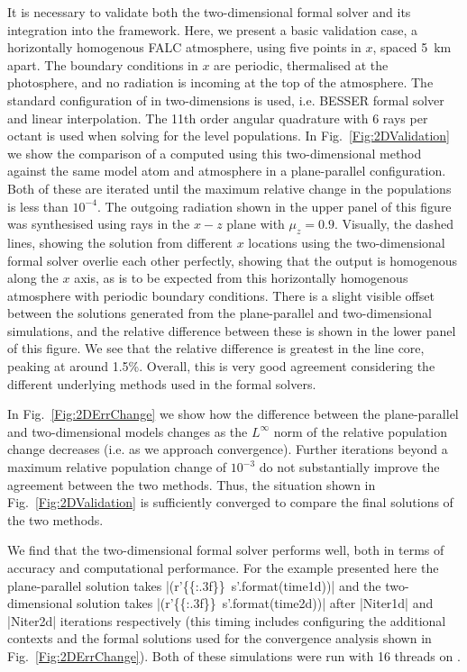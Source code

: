 It is necessary to validate both the two-dimensional formal solver and its integration into the \Lw{} framework.
Here, we present a basic validation case, a horizontally homogenous FALC atmosphere, using five points in $x$, spaced \SI{5}{\kilo\metre} apart.
The boundary conditions in $x$ are periodic, thermalised at the photosphere, and no radiation is incoming at the top of the atmosphere.
The standard configuration of \Lw{} in two-dimensions is used, i.e. BESSER formal solver and linear interpolation.
The 11th order angular quadrature with 6 rays per octant \citep{Stepan2020} is used when solving for the level populations.
In Fig.~\ref{Fig:2DValidation} we show the comparison of a \CaLine{} computed using this two-dimensional method against the same model atom and atmosphere in a plane-parallel configuration.
Both of these are iterated until the maximum relative change in the \Caii{} populations is less than $10^{-4}$.
The outgoing radiation shown in the upper panel of this figure was synthesised using rays in the $x-z$ plane with $\mu_z = 0.9$.
Visually, the dashed lines, showing the solution from different $x$ locations using the two-dimensional formal solver overlie each other perfectly, showing that the output is homogenous along the $x$ axis, as is to be expected from this horizontally homogenous atmosphere with periodic boundary conditions.
There is a slight visible offset between the solutions generated from the plane-parallel and two-dimensional simulations, and the relative difference between these is shown in the lower panel of this figure.
We see that the relative difference is greatest in the line core, peaking at around 1.5\%.
Overall, this is very good agreement considering the different underlying methods used in the formal solvers.

In Fig.~\ref{Fig:2DErrChange} we show how the difference between the plane-parallel and two-dimensional models changes as the $L^\infty$ norm of the relative population change decreases (i.e. as we approach convergence).
Further iterations beyond a maximum relative population change of $10^{-3}$ do not substantially improve the agreement between the two methods.
Thus, the situation shown in Fig.~\ref{Fig:2DValidation} is sufficiently converged to compare the final solutions of the two methods.

We find that the two-dimensional formal solver performs well, both in terms of accuracy and computational performance. For the example presented here the plane-parallel solution takes \py[2DValidation]|(r'\SI{{{:.3f}}}{{\second}}'.format(time1d))| and the two-dimensional solution takes \py[2DValidation]|(r'\SI{{{:.3f}}}{{\second}}'.format(time2d))| after \py[2DValidation]|Niter1d| and \py[2DValidation]|Niter2d| iterations respectively (this timing includes configuring the additional contexts and the formal solutions used for the convergence analysis shown in Fig.~\ref{Fig:2DErrChange}).
Both of these simulations were run with 16 threads on .

